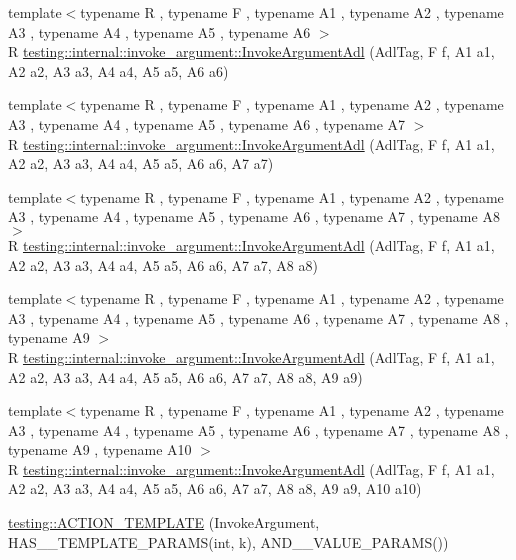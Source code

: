 \begin{DoxyCompactItemize}
{\footnotesize template$<$typename R , typename F , typename A1 , typename A2 , typename A3 , typename A4 , typename A5 , typename A6 $>$ }\\R \mbox{\hyperlink{namespacetesting_1_1internal_1_1invoke__argument_a16bf1b90d183210a82fbbef4e2eef1c5}{testing\+::internal\+::invoke\+\_\+argument\+::\+Invoke\+Argument\+Adl}} (Adl\+Tag, F f, A1 a1, A2 a2, A3 a3, A4 a4, A5 a5, A6 a6)
\item 
{\footnotesize template$<$typename R , typename F , typename A1 , typename A2 , typename A3 , typename A4 , typename A5 , typename A6 , typename A7 $>$ }\\R \mbox{\hyperlink{namespacetesting_1_1internal_1_1invoke__argument_a77f581ed8b270ed4752d49d5bdd59e84}{testing\+::internal\+::invoke\+\_\+argument\+::\+Invoke\+Argument\+Adl}} (Adl\+Tag, F f, A1 a1, A2 a2, A3 a3, A4 a4, A5 a5, A6 a6, A7 a7)
\item 
{\footnotesize template$<$typename R , typename F , typename A1 , typename A2 , typename A3 , typename A4 , typename A5 , typename A6 , typename A7 , typename A8 $>$ }\\R \mbox{\hyperlink{namespacetesting_1_1internal_1_1invoke__argument_a43c35b90896110940a0cc41c337ca306}{testing\+::internal\+::invoke\+\_\+argument\+::\+Invoke\+Argument\+Adl}} (Adl\+Tag, F f, A1 a1, A2 a2, A3 a3, A4 a4, A5 a5, A6 a6, A7 a7, A8 a8)
\item 
{\footnotesize template$<$typename R , typename F , typename A1 , typename A2 , typename A3 , typename A4 , typename A5 , typename A6 , typename A7 , typename A8 , typename A9 $>$ }\\R \mbox{\hyperlink{namespacetesting_1_1internal_1_1invoke__argument_a6e204965286414aac5113286eb5c8996}{testing\+::internal\+::invoke\+\_\+argument\+::\+Invoke\+Argument\+Adl}} (Adl\+Tag, F f, A1 a1, A2 a2, A3 a3, A4 a4, A5 a5, A6 a6, A7 a7, A8 a8, A9 a9)
\item 
{\footnotesize template$<$typename R , typename F , typename A1 , typename A2 , typename A3 , typename A4 , typename A5 , typename A6 , typename A7 , typename A8 , typename A9 , typename A10 $>$ }\\R \mbox{\hyperlink{namespacetesting_1_1internal_1_1invoke__argument_abd36164191a3e386c50243074854b272}{testing\+::internal\+::invoke\+\_\+argument\+::\+Invoke\+Argument\+Adl}} (Adl\+Tag, F f, A1 a1, A2 a2, A3 a3, A4 a4, A5 a5, A6 a6, A7 a7, A8 a8, A9 a9, A10 a10)
\item 
\mbox{\hyperlink{namespacetesting_a8a02397c7fdf8e84d559ab72dcc28eb1}{testing\+::\+A\+C\+T\+I\+O\+N\+\_\+\+T\+E\+M\+P\+L\+A\+TE}} (Invoke\+Argument, H\+A\+S\+\_\+\_\+\+T\+E\+M\+P\+L\+A\+T\+E\+\_\+\+P\+A\+R\+A\+MS(int, k), A\+N\+D\+\_\+\_\+\+V\+A\+L\+U\+E\+\_\+\+P\+A\+R\+A\+MS())

\end{DoxyCompactItemize}
